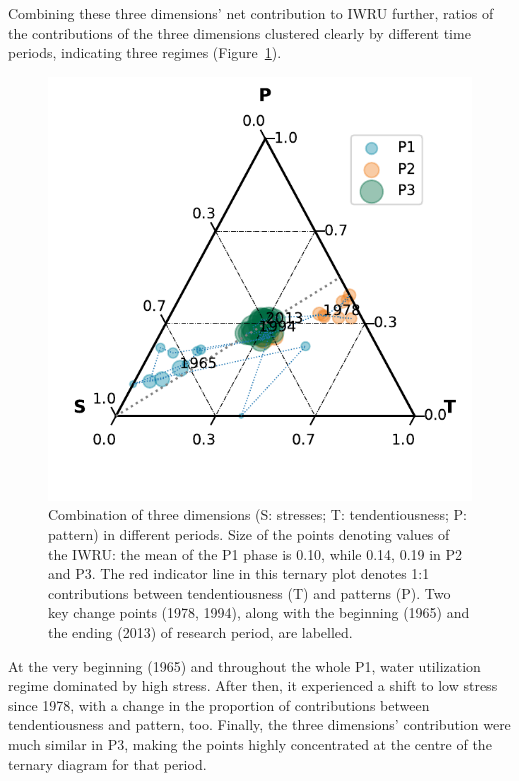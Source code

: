 \documentclass[9pt, twocolumn, twoside, lineno]{pnas-new}
\begin{document}
Combining these three dimensions' net contribution to IWRU further, ratios of the contributions of the three dimensions clustered clearly by different time periods, indicating three regimes (Figure~\ref{fig:phases}).
\begin{figure}%
	\centering
	\includegraphics[width=\linewidth]{../../figures/main_text/phases.pdf}
	\caption{Combination of three dimensions (S: stresses; T: tendentiousness; P: pattern) in different periods. 
	Size of the points denoting values of the IWRU: the mean of the P1 phase is 0.10, while 0.14, 0.19 in P2 and P3.
	The red indicator line in this ternary plot denotes 1:1 contributions between tendentiousness (T) and patterns (P).
	Two key change points (1978, 1994), along with the beginning (1965) and the ending (2013) of research period, are labelled.}
	\label{fig:phases}
\end{figure}
At the very beginning (1965) and throughout the whole P1, water utilization regime dominated by high stress. After then, it experienced a shift to low stress since 1978, with a change in the proportion of contributions between tendentiousness and pattern, too.
Finally, the three dimensions' contribution were much similar in P3, making the points highly concentrated at the centre of the ternary diagram for that period.
\end{document}
